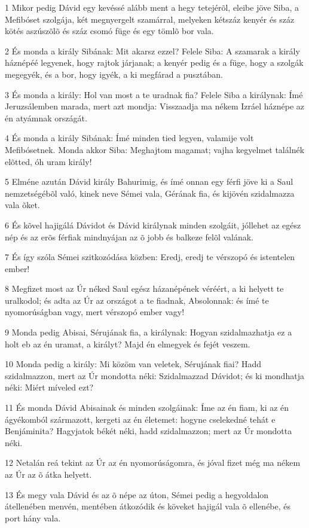\par 1 Mikor pedig Dávid egy kevéssé alább ment a hegy tetejérõl, eleibe jöve Siba, a Mefibóset szolgája, két megnyergelt szamárral, melyeken kétszáz kenyér és száz kötés aszúszõlõ és száz csomó füge és egy tömlõ bor vala.
\par 2 És monda a király Sibának: Mit akarsz ezzel? Felele Siba: A szamarak a király háznépéé legyenek, hogy rajtok járjanak; a kenyér pedig és a füge, hogy a szolgák megegyék, és a bor, hogy igyék, a ki megfárad a pusztában.
\par 3 És monda a király: Hol van most a te uradnak fia? Felele Siba a királynak: Ímé Jeruzsálemben marada, mert azt mondja: Visszaadja  ma nékem Izráel háznépe az én atyámnak országát.
\par 4 És monda a király Sibának: Ímé minden tied legyen, valamije volt Mefibósetnek. Monda akkor Siba: Meghajtom magamat; vajha kegyelmet találnék elõtted, óh uram király!
\par 5 Elméne azután Dávid király Bahurimig, és ímé onnan egy férfi jöve ki a Saul nemzetségébõl való, kinek neve Sémei vala, Gérának fia, és kijövén szidalmazza vala õket.
\par 6 És kõvel hajigálá Dávidot és Dávid királynak minden szolgáit, jóllehet az egész nép és az erõs férfiak mindnyájan az õ jobb és balkeze felõl valának.
\par 7 És így szóla Sémei szitkozódása közben: Eredj, eredj te vérszopó és istentelen ember!
\par 8 Megfizet most az Úr néked Saul egész házanépének véréért, a ki helyett te uralkodol; és adta az Úr az országot a te fiadnak, Absolonnak: és ímé te nyomorúságban vagy, mert vérszopó ember vagy!
\par 9 Monda pedig Abisai, Sérujának fia, a királynak: Hogyan szidalmazhatja ez a holt eb az én uramat, a királyt? Majd én elmegyek és fejét veszem.
\par 10 Monda pedig a király: Mi közöm van veletek, Sérujának fiai? Hadd szidalmazzon, mert az Úr mondotta néki: Szidalmazzad Dávidot; és ki mondhatja néki: Miért míveled ezt?
\par 11 És monda Dávid Abisainak és minden szolgáinak: Íme az én fiam, ki az én ágyékomból származott, kergeti az én életemet: hogyne cselekedné tehát e Benjáminita? Hagyjatok békét néki, hadd szidalmazzon; mert az Úr mondotta néki.
\par 12 Netalán reá tekint az Úr az én nyomorúságomra, és jóval fizet még ma nékem az Úr az õ átka helyett.
\par 13 És megy vala Dávid és az õ népe az úton, Sémei pedig a hegyoldalon átellenében menvén, mentében átkozódik és köveket hajigál vala õ ellenébe, és port hány vala.
